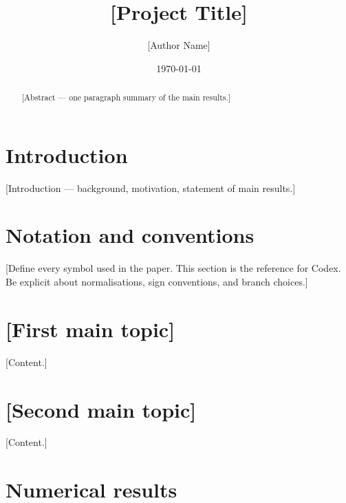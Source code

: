 \documentclass[11pt, a4paper]{article}
\title{[Project Title]}
\author{[Author Name]}
\date{\today}
\theoremstyle{plain}
\theoremstyle{definition}
\begin{document}
\maketitle

\begin{abstract}
[Abstract — one paragraph summary of the main results.]
\end{abstract}

\tableofcontents
\newpage

\section{Introduction}
\label{sec:intro}

[Introduction — background, motivation, statement of main results.]

\section{Notation and conventions}
\label{sec:conventions}

[Define every symbol used in the paper. This section is the reference for
Codex. Be explicit about normalisations, sign conventions, and branch choices.]

\section{[First main topic]}
\label{sec:topic1}

[Content.]

\section{[Second main topic]}
\label{sec:topic2}

[Content.]

\section{Numerical results}
\label{sec:numerics}
\end{document}
